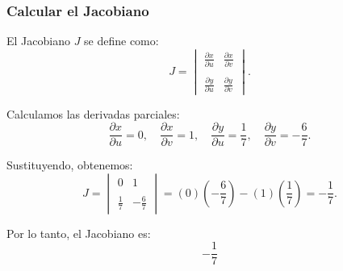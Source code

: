 \subsubsection*{Calcular el Jacobiano}
El Jacobiano \(J\) se define como:
\[
J = \begin{vmatrix}
\frac{\partial x}{\partial u} & \frac{\partial x}{\partial v} \\\\
\frac{\partial y}{\partial u} & \frac{\partial y}{\partial v}
\end{vmatrix}.
\]

Calculamos las derivadas parciales:
\[
\frac{\partial x}{\partial u} = 0, \quad \frac{\partial x}{\partial v} = 1, \quad \frac{\partial y}{\partial u} = \frac{1}{7}, \quad \frac{\partial y}{\partial v} = -\frac{6}{7}.
\]

Sustituyendo, obtenemos:
\[
J = \begin{vmatrix}
0 & 1 \\\\
\frac{1}{7} & -\frac{6}{7}
\end{vmatrix} = (0)(-\frac{6}{7}) - (1)(\frac{1}{7}) = -\frac{1}{7}.
\]

Por lo tanto, el Jacobiano es:
\[
\boxed{-\frac{1}{7}}
\]
